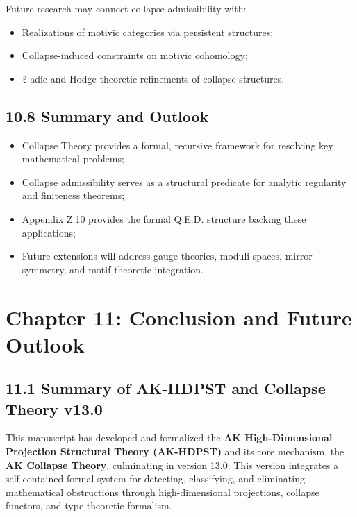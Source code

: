 \documentclass[11pt]{article}
\begin{document}
Future research may connect collapse admissibility with:

\begin{itemize}
    \item Realizations of motivic categories via persistent structures;
    \item Collapse-induced constraints on motivic cohomology;
    \item ℓ-adic and Hodge-theoretic refinements of collapse structures.
\end{itemize}

\subsection*{10.8 Summary and Outlook}

\begin{itemize}
    \item Collapse Theory provides a formal, recursive framework for resolving key mathematical problems;
    \item Collapse admissibility serves as a structural predicate for analytic regularity and finiteness theorems;
    \item Appendix Z.10 provides the formal Q.E.D. structure backing these applications;
    \item Future extensions will address gauge theories, moduli spaces, mirror symmetry, and motif-theoretic integration.
\end{itemize}



\section{Chapter 11: Conclusion and Future Outlook}

\subsection*{11.1 Summary of AK-HDPST and Collapse Theory v13.0}

This manuscript has developed and formalized the \textbf{AK High-Dimensional Projection Structural Theory (AK-HDPST)} and its core mechanism, the \textbf{AK Collapse Theory}, culminating in version 13.0. This version integrates a self-contained formal system for detecting, classifying, and eliminating mathematical obstructions through high-dimensional projections, collapse functors, and type-theoretic formalism.
\end{document}
